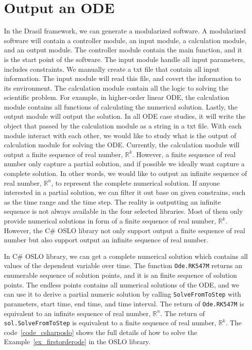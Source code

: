\section{Output an ODE}
In the Drasil framework, we can generate a modularized software. A modularized software will contain a controller module, an input module, a calculation module, and an output module. The controller module contain the main function, and it is the start point of the software. The input module handle all input parameters, includes constraints. We manually create a txt file that contain all input information. The input module will read this file, and covert the information to its environment. The calculation module contain all the logic to solving the scientific problem. For example, in higher-order linear ODE, the calculation module contains all functions of calculating the numerical solution. Lastly, the output module will output the solution. In all ODE case studies, it will write the object that passed by the calculation module as a string in a txt file. With each module interact with each other, we would like to study what is the output of calculation module for solving the ODE. Currently, the calculation module will output a finite sequence of real number, $\mathbb{R}^k$. However, a finite sequence of real number only capture a partial solution, and if possible we ideally want capture a complete solution. In other words, we would like to output an infinite sequence of real number, $\mathbb{R}^n$, to represent the complete numerical solution. If anyone interested in a partial solution, we can filter it out base on given constrains, such as the time range and the time step. The reality is outputting an infinite sequence is not always available in the four selected libraries. Most of them only provide numerical solutions in form of a finite sequence of real number, $\mathbb{R}^k$. However, the C\# OSLO library not only support output a finite sequence of real number but also support output an infinite sequence of real number. 

In C\# OSLO library, we can get a complete numerical solution which contains all values of the dependent variable over time. The function \verb|Ode.RK547M| returns an enumerable sequence of solution points, and it is an finite sequence of solution points. The endless points contains all numerical solutions of the ODE, and we can use it to derive a partial numeric solution by calling \verb|SolveFromToStep| with parameters, start time, end time, and time interval. The return of \verb|Ode.RK547M| is equivalent to an infinite sequence of real number, $\mathbb{R}^n$. The return of \verb|sol.SolveFromToStep| is equivalent to a finite sequence of real number, $\mathbb{R}^k$. The code~\ref{code_csharposlo} shows the full details of how to solve the Example~\ref{ex_firstorderode} in the OSLO library.

